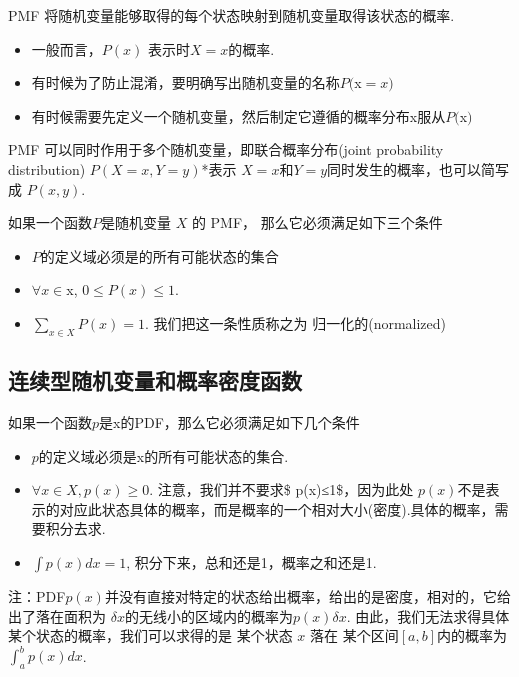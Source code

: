 PMF 将随机变量能够取得的每个状态映射到随机变量取得该状态的概率.

\begin{itemize}
 
\item
  一般而言，\(P(x)​\) 表示时\(X=x​\)的概率.
\item
  有时候为了防止混淆，要明确写出随机变量的名称\(P(​\)x\(=x)​\)
\item
  有时候需要先定义一个随机变量，然后制定它遵循的概率分布x服从\(P(​\)x​\()​\)
\end{itemize}

PMF 可以同时作用于多个随机变量，即联合概率分布(joint probability
distribution) \(P(X=x,Y=y)\)*表示
\(X=x\)和\(Y=y\)同时发生的概率，也可以简写成 \(P(x,y)\).

如果一个函数\(P​\)是随机变量 \(X​\) 的 PMF， 那么它必须满足如下三个条件

\begin{itemize}
 
\item
  \(P​\)的定义域必须是的所有可能状态的集合
\item
  \(∀x∈​\)x, \(0 \leq P(x) \leq 1 ​\).
\item
  \(∑_{x∈X} P(x)=1\). 我们把这一条性质称之为 归一化的(normalized)
\end{itemize}

\subsection{连续型随机变量和概率密度函数}\label{ux8fdeux7eedux578bux968fux673aux53d8ux91cfux548cux6982ux7387ux5bc6ux5ea6ux51fdux6570}

如果一个函数\(p​\)是x的PDF，那么它必须满足如下几个条件

\begin{itemize}
 
\item
  \(p\)的定义域必须是x的所有可能状态的集合.
\item
  \(∀x∈X,p(x)≥0\). 注意，我们并不要求\$ p(x)≤1\$，因为此处
  \(p(x)\)不是表示的对应此状态具体的概率，而是概率的一个相对大小(密度).具体的概率，需要积分去求.
\item
  \(∫p(x)dx=1\), 积分下来，总和还是1，概率之和还是1.
\end{itemize}

注：PDF\(p(x)\)并没有直接对特定的状态给出概率，给出的是密度，相对的，它给出了落在面积为
\(δx\)的无线小的区域内的概率为$ p(x)δx$.
由此，我们无法求得具体某个状态的概率，我们可以求得的是 某个状态 \(x\)
落在 某个区间\([a,b]\)内的概率为$ \int_{a}^{b}p(x)dx$.

